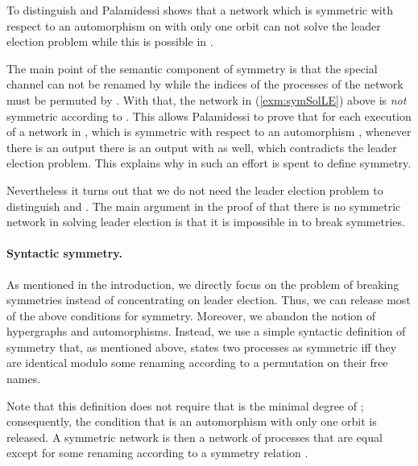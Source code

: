 \documentclass[11pt,techReport]{eptcs}
\begin{document}
To distinguish \pimix and \pisep Palamidessi shows that a network  which is symmetric with respect to an automorphism  on  with only one orbit can not solve the leader election problem while this is possible in \pimix.

The main point of the semantic component of symmetry is that the special channel  can not be renamed by  while the indices of the processes of the network must be permuted by .  With that, the network  in (\ref{exm:symSolLE}) above is \emph{not} symmetric according to \cite{palamidessi03}.  This allows Palamidessi to prove that for each execution of a network in \procsep, which is symmetric with respect to an automorphism , whenever there is an output  there is an output  with  as well, which contradicts the leader election problem. This explains why in \cite{bouge88, palamidessi03, vigliottiPhillipsPalamidessi07} such an effort is spent to define symmetry.

Nevertheless it turns out that we do not need the leader election problem to distinguish \pimix and \pisep. The main argument in the proof of \cite{palamidessi03} that there is no symmetric network in \procsep solving leader election is that it is impossible in \pisep to break symmetries.

\paragraph{Syntactic symmetry.}

As mentioned in the introduction, we directly focus on the problem of breaking symmetries instead of concentrating on leader election. Thus, we can release most of the above conditions for symmetry. Moreover, we abandon the notion of hypergraphs and automorphisms. Instead, we use a simple syntactic definition of symmetry that, as mentioned above, states two processes as symmetric iff they are identical modulo some renaming according to a permutation  on their free names.

\noindent
Note that this definition does not require that  is the minimal degree of ; consequently, the condition that  is an automorphism with only one orbit is released. A symmetric network is then a network of  processes that are equal except for some renaming according to a symmetry relation .
\end{document}
